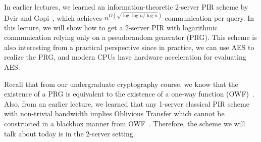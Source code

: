 \newcommand{\DpfGen}{\ensuremath{{\sf DPF.Gen}}}
\newcommand{\DpfEval}{\ensuremath{{\sf DPF.Eval}}}
\newcommand{\Dpf}{\ensuremath{{\sf DPF}}}
\newcommand{\DPF}{\ensuremath{{\sf DPF}}}
\newcommand{\Prg}{\ensuremath{{\sf PRG}}}
\newcommand{\Pbc}{\ensuremath{{\sf PBC}}}

\newcommand{\GenSched}{\ensuremath{{\sf GenSchedule}}}
\newcommand{\ServerPre}{\ensuremath{{\sf ServerPreprocess}}}
\newcommand{\ClientQ}{\ensuremath{{\sf ClientQuery}}}
\newcommand{\ServerA}{\ensuremath{{\sf ServerAnswer}}}
\newcommand{\ClientD}{\ensuremath{{\sf ClientDecode}}}
\newcommand{\get}{\ensuremath{\leftarrow}}
\newcommand{\Client}{\textsf{Client}~}
\newcommand{\Server}{\textsf{Server}~}
\newcommand{\CV}{\ensuremath{{\sf CV}}}

\renewcommand{\root}{\ensuremath{{\sf root}}}


In earlier lectures, we learned an information-theoretic 2-server PIR
scheme 
by Dvir and Gopi~\cite{dvir20162}, which
achieves $n^{O(\sqrt{\log \log n / \log n})}$ communication per query. 
In this lecture, 
we will show how to get a 2-server PIR with logarithmic communication
relying only on a pseudorandom 
generator (PRG). This scheme is also interesting from a practical perspective
since in practice, we can use AES to realize
the PRG, and modern CPUs have hardware acceleration
for evaluating AES. 

Recall that 
from our undergraduate cryptography course, 
we know that the existence of a PRG
is equivalent to the existence of a one-way function (OWF)~\cite{haastad1999pseudorandom}.
Also, from an earlier lecture, we learned that any 1-server
classical PIR scheme 
with non-trivial bandwidth implies
Oblivious Transfer which cannot be constructed
in a blackbox manner from OWF~\cite{IR89}. 
Therefore, the scheme we will talk about today is in the 2-server setting.


